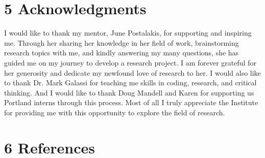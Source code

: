 \documentclass[12pt]{article}
\begin{document}
\section*{5 Acknowledgments}
I would like to thank my mentor, June Postalakis, for supporting and inspiring me. Through her sharing her knowledge in her field of work, brainstorming research topics with me, and kindly answering my many questions, she has guided me on my journey to develop a research project. I am forever grateful for her generosity and dedicate my newfound love of research to her. I would also like to thank Dr. Mark Galassi for teaching me skills in coding, research, and critical thinking. And I would like to thank Doug Mandell and Karen for supporting us Portland interns through this process. Most of all I truly appreciate the Institute for providing me with this opportunity to explore the field of research.\\

\section*{6 References}
\nocite{*}
\printbibliography[heading=none]
\end{document}
